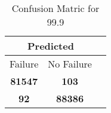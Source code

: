 \begin{table}[] 
\label{Table: Prediction Accuracy-DMD99.9OnlySunEKF-ignoreReflection-Reflection} 
\caption{Confusion Matric for 99.9} 
\centering 
\begin{tabular} 
 {@{}ccc@{}} 
\toprule 
\multicolumn{2}{c}{\textbf{Predicted}}
 \\ \midrule 
\multicolumn{1}{|c|}{Failure} & 
\multicolumn{1}{c|}{No Failure}
 \\ \midrule 
\multicolumn{1}{|c|}{\color{green}\textbf{81547}} & 
\multicolumn{1}{c|}{\color{red}\textbf{103}}
 \\ \midrule 
\multicolumn{1}{|c|}{\color{red}\textbf{92}} & 
\multicolumn{1}{c|}{\color{green}\textbf{88386}}
 \\ \bottomrule 
\end{tabular} 
\end{table} 
